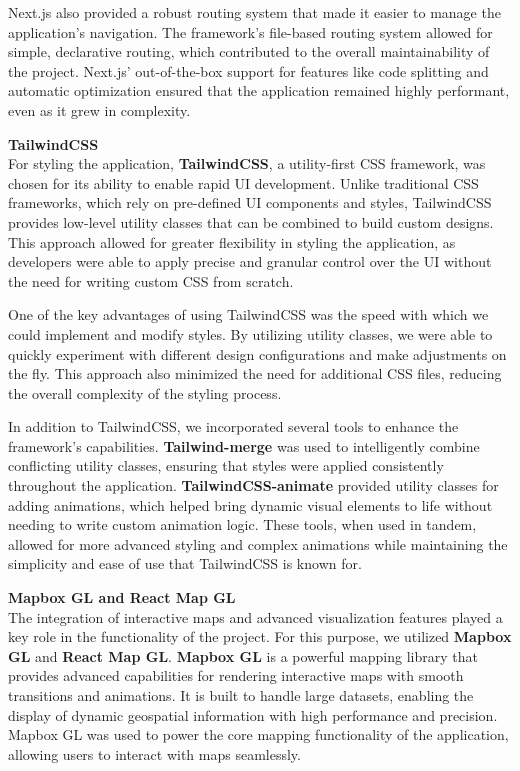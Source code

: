 Next.js also provided a robust routing system that made it easier to manage
the application's navigation. The framework's file{-}based routing system
allowed for simple, declarative routing, which contributed to the overall
maintainability of the project. Next.js' out{-}of{-}the{-}box support for
features like code splitting and automatic optimization ensured that the
application remained highly performant, even as it grew in complexity.

\newpage{}

\textbf{TailwindCSS} \\
For styling the application, \textbf{TailwindCSS}, a utility{-}first CSS
framework, was chosen for its ability to enable rapid UI development. Unlike
traditional CSS frameworks, which rely on pre{-}defined UI components and
styles, TailwindCSS provides low{-}level utility classes that can be
combined to build custom designs. This approach allowed for greater
flexibility in styling the application, as developers were able to apply
precise and granular control over the UI without the need for writing custom
CSS from scratch.

One of the key advantages of using TailwindCSS was the speed with which we
could implement and modify styles. By utilizing utility classes, we were
able to quickly experiment with different design configurations and make
adjustments on the fly. This approach also minimized the need for additional
CSS files, reducing the overall complexity of the styling process.

In addition to TailwindCSS, we incorporated several tools to enhance the
framework's capabilities. \textbf{Tailwind{-}merge} was used to
intelligently combine conflicting utility classes, ensuring that styles were
applied consistently throughout the application.
\textbf{TailwindCSS{-}animate} provided utility classes for adding
animations, which helped bring dynamic visual elements to life without
needing to write custom animation logic. These tools, when used in tandem,
allowed for more advanced styling and complex animations while maintaining
the simplicity and ease of use that TailwindCSS is known for.

\vspace{0.5cm}

\textbf{Mapbox GL and React Map GL} \\
The integration of interactive maps and advanced visualization features
played a key role in the functionality of the project. For this purpose, we
utilized \textbf{Mapbox GL} and \textbf{React Map GL}. \textbf{Mapbox GL} is
a powerful mapping library that provides advanced capabilities for rendering
interactive maps with smooth transitions and animations. It is built to
handle large datasets, enabling the display of dynamic geospatial
information with high performance and precision. Mapbox GL was used to power
the core mapping functionality of the application, allowing users to
interact with maps seamlessly.

